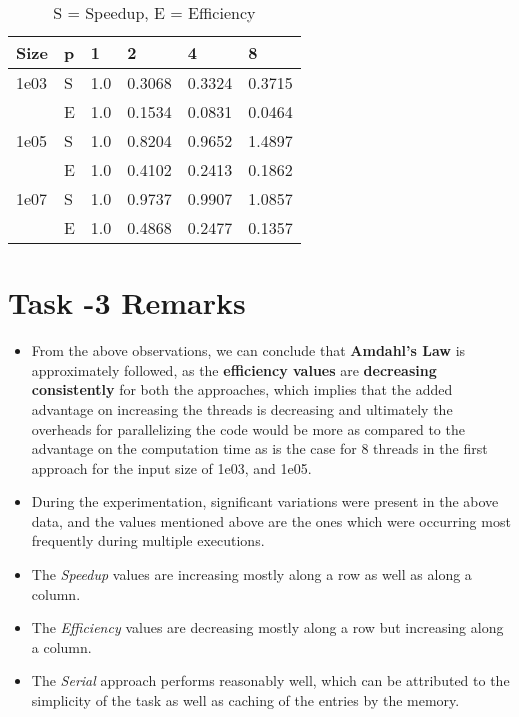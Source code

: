 \documentclass[12pt]{article}
\begin{document}
    \begin{table}[H]
      \begin{tabular}{llllll} \toprule
          \textbf{Size} &\textbf{p} & \textbf{1} & \textbf{2} & \textbf{4} & \textbf{8}\\\midrule
          1e03 & S & 1.0 & 0.3068 & 0.3324 & 0.3715\\
              & E & 1.0 & 0.1534 & 0.0831 & 0.0464\\
          1e05 & S & 1.0 & 0.8204 & 0.9652 & 1.4897\\
              & E & 1.0 & 0.4102 & 0.2413 & 0.1862\\
          1e07 & S & 1.0 & 0.9737 & 0.9907 & 1.0857 \\
              & E & 1.0 & 0.4868 & 0.2477 & 0.1357
          \\\bottomrule
        \end{tabular}
      \caption{S = Speedup, E = Efficiency}\label{Tab1}
    \end{table} 

    \section*{Task -3 Remarks}

    \begin{itemize}
      \item From the above observations, we can conclude that \textbf{Amdahl's Law} is approximately followed, as the \textbf{efficiency values} are \textbf{decreasing consistently} for both the approaches, which implies that the added advantage on increasing the threads is decreasing and ultimately the overheads for parallelizing the code would be more as compared to the advantage on the computation time as is the case for 8 threads in the first approach for the input size of 1e03, and 1e05.
      \item During the experimentation, significant variations were present in the above data, and the values mentioned above are the ones which were occurring most frequently during multiple executions.
      \item The \emph{Speedup} values are increasing mostly along a row as well as along a column.
      \item The \emph{Efficiency} values are decreasing mostly along a row but increasing along a column.
      \item The \emph{Serial} approach performs reasonably well, which can be attributed to the simplicity of the task as well as caching of the entries by the memory.
    \end{itemize}
\end{document}
